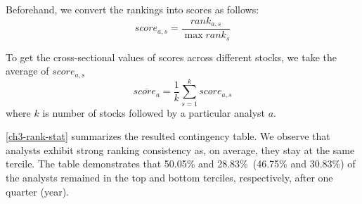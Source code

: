 \documentclass[12pt,a4paper]{article}\usepackage[]{graphicx}\usepackage[]{color}
\begin{document}
Beforehand, we convert the rankings into scores as follows:
\begin{equation}
\label{ch3-eq:score}
score_{a,s}=\frac{rank_{a,s}}{\max{rank_s}}
\end{equation}

To get the cross-sectional values of scores across different stocks, we take the average of $score_{a,s}$
\begin{equation}
\label{ch3-eq:mean-score}
\overline{score_{a}}= \frac{1}{k} \sum_{s=1}^{k} score_{a,s}
\end{equation}
where $k$ is number of stocks followed by a particular analyst $a$.

\ref{ch3-rank-stat} summarizes the resulted contingency table. We observe that analysts exhibit strong ranking consistency as, on average, they stay at the same tercile. The table demonstrates that 50.05\% and  28.83\%~(46.75\% and 30.83\%) of the analysts  remained in the top and bottom terciles, respectively, after one quarter (year).

\end{document}
